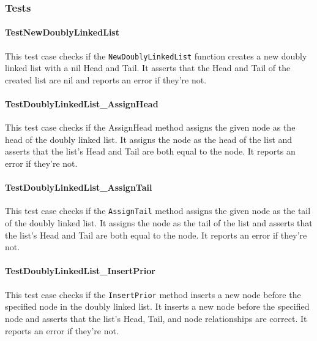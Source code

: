 \subsubsection{Tests}
\paragraph{TestNewDoublyLinkedList}
This test case checks if the \lstinline{NewDoublyLinkedList} function creates a new doubly linked list with a nil Head and Tail. It asserts that the Head and Tail of the created list are nil and reports an error if they're not.

\paragraph{TestDoublyLinkedList\_AssignHead}
This test case checks if the AssignHead method assigns the given node as the head of the doubly linked list. It assigns the node as the head of the list and asserts that the list's Head and Tail are both equal to the node. It reports an error if they're not.

\paragraph{TestDoublyLinkedList\_AssignTail}
This test case checks if the \lstinline{AssignTail} method assigns the given node as the tail of the doubly linked list. It assigns the node as the tail of the list and asserts that the list's Head and Tail are both equal to the node. It reports an error if they're not.

\paragraph{TestDoublyLinkedList\_InsertPrior}
This test case checks if the \lstinline{InsertPrior} method inserts a new node before the specified node in the doubly linked list. It inserts a new node before the specified node and asserts that the list's Head, Tail, and node relationships are correct. It reports an error if they're not.

